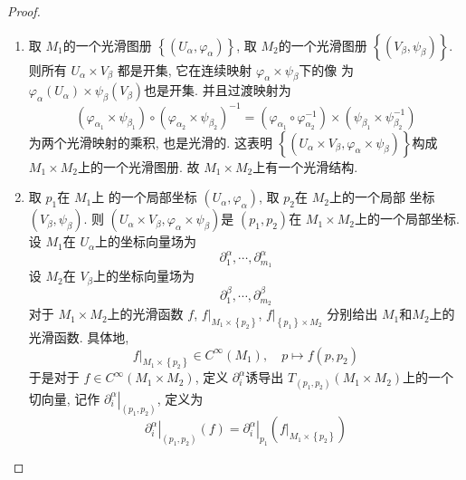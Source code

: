 \documentclass[../main.tex]{subfiles}
\begin{document}
\begin{proof}
    \begin{enumerate}
        \item[a).] 取 \(  M_1  \)的一个光滑图册 \(  \left\{ \left( U_{\alpha },  \varphi _{\alpha } \right)  \right\}  \), 取 \(  M_2  \)的一个光滑图册 \(  \left\{ \left( V_{\beta },\psi _{\beta } \right)  \right\}  \). 则所有 \(  U_{\alpha }\times V_{\beta }  \)     都是开集, 它在连续映射 \(   \varphi _{\alpha }\times \psi _{\beta }  \)下的像 为 \(   \varphi _{\alpha }\left( U_{\alpha } \right)\times \psi _{\beta }\left( V_{\beta } \right)    \)也是开集. 并且过渡映射为  \[
        \left(  \varphi _{\alpha _1 }\times \psi _{\beta _1 } \right) \circ\left(  \varphi _{\alpha _2 }\times \psi _{\beta _2 } \right) ^{-1} = \left(  \varphi _{\alpha _1 }\circ \varphi _{\alpha _2 }^{-1}  \right)\times \left( \psi _{\beta _1 }\times \psi _{\beta _2 }^{-1}  \right)   
        \]为两个光滑映射的乘积, 也是光滑的. 这表明 \(  \left\{ \left( U_{\alpha }\times V_{\beta } ,  \varphi _{\alpha }\times \psi _{\beta } \right) \right\}  \)构成 \(  M_1\times M_2  \)上的一个光滑图册. 故 \(  M_1\times M_2  \)上有一个光滑结构.
        \item[b).]   取 \(  p_1  \)在 \(  M_1  \)上 的一个局部坐标 \(  \left( U_{\alpha },  \varphi _{\alpha } \right)   \), 取 \(  p_2  \)在 \(  M_2  \)上的一个局部 坐标 \(  \left( V_{\beta },\psi _{\beta } \right)   \). 则 \(  \left( U_{\alpha }\times V_{\beta },  \varphi _{\alpha }\times \psi _{\beta } \right)   \)是 \(  \left( p_1,p_2 \right)   \)在 \(  M_1\times M_2  \)上的一个局部坐标.    设 \(  M_1  \)在 \(  U_{\alpha }  \)上的坐标向量场为 \[
         \partial^{\alpha }_{1},\cdots , \partial ^{\alpha }_{m_1}
        \]设 \(  M_2  \)在 \(  V_{\beta }  \)上的坐标向量场为 \[
         \partial ^{\beta }_{1},\cdots , \partial ^{\beta }_{m_2}
        \]   对于 \(  M_1\times M_2  \)上的光滑函数 \(  f  \), \(  f|_{M_1\times \left\{ p_2 \right\}}  \), \( f|_{\left\{ p_1 \right\}\times M_2 }  \)    分别给出 \(  M_1  \)和\(  M_2  \)上的光滑函数. 具体地, \[
        f|_{M_1\times \left\{ p_2 \right\}}\in C^{\infty}\left( M_1 \right),\quad p\mapsto f\left( p,p_2 \right)  
        \]   于是对于 \(  f\in C^{\infty}\left( M_1\times M_2 \right)   \), 定义 \(   \partial _{i}^{\alpha }  \)诱导出 \(  T_{\left( p_1,p_2 \right) }\left( M_1\times M_2 \right)   \)上的一个切向量, 记作 \(  \left.  \partial _{i}^{\alpha } \right|_{\left( p_1,p_2 \right) }  \), 定义为    \[
        \left.  \partial _{i}^{\alpha  } \right|_{\left( p_1,p_2 \right) }\left( f \right)= \left.  \partial _{i}^{\alpha } \right|_{p_1} \left( f|_{M_1\times \left\{ p_2 \right\}}   \right) 
\]
\end{enumerate}
\end{proof}
\end{document}
